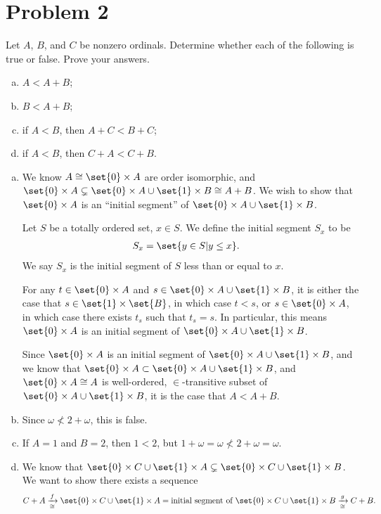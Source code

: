 \documentclass[10pt]{mypackage}
\begin{document}
\section{Problem 2}%
\begin{problem}
  Let $A$, $B$, and $C$ be nonzero ordinals. Determine whether each of the following is true or false. Prove your answers.
  \begin{enumerate}[(a)]
    \item $A < A+B$;
    \item $B < A+B$;
    \item if $A < B$, then $A+C < B+C$;
    \item if $A < B$, then $C+A < C+B$.
  \end{enumerate}
\end{problem}
\begin{solution}\hfill
  \begin{enumerate}[(a)]
    \item We know $A\cong \set{0} \times A$ are order isomorphic, and $\set{0}\times A \subsetneq \set{0}\times A \cup \set{1}\times B\cong A+B$. We wish to show that $\set{0}\times A $ is an ``initial segment'' of $\set{0}\times A \cup \set{1}\times B$.
      \begin{definition}
        Let $S$ be a totally ordered set, $x\in S$. We define the initial segment $S_x$ to be
        \begin{align*}
          S_x &= \set{y\in S|y \leq x}.
        \end{align*}
        We say $S_x$ is the initial segment of $S$ less than or equal to $x$.
      \end{definition}
      For any $t\in \set{0}\times A$ and $s\in \set{0}\times A \cup \set{1}\times B$, it is either the case that $s\in \set{1}\times \set{B}$, in which case $t < s$, or $s\in \set{0}\times A$, in which case there exists $t_s$ such that $t_s = s$. In particular, this means $\set{0}\times A$ is an initial segment of $\set{0}\times A\cup \set{1}\times B$.\newline

      Since $\set{0}\times A$ is an initial segment of $\set{0}\times A\cup \set{1}\times B$, and we know that $\set{0}\times A \subset \set{0}\times A \cup \set{1}\times B$, and $\set{0}\times A\cong A$ is well-ordered, $\in$-transitive subset of $\set{0}\times A\cup \set{1}\times B$, it is the case that $A < A + B$.
    \item Since $\omega \not< 2 + \omega$, this is false.
    \item If $A = 1$ and $B = 2$, then $1 < 2$, but $1 + \omega = \omega \not< 2 + \omega = \omega$.
    \item We know that $\set{0}\times C \cup \set{1}\times A \subsetneq \set{0}\times C \cup \set{1}\times B$. We want to show there exists a sequence
      \begin{align*}
        C+A\xrightarrow[\cong]{f} \set{0}\times C \cup \set{1}\times A = \text{initial segment of }\set{0}\times C \cup \set{1}\times B \xrightarrow[\cong]{g} C+B.
      \end{align*}

  \end{enumerate}
\end{solution}
\end{document}

